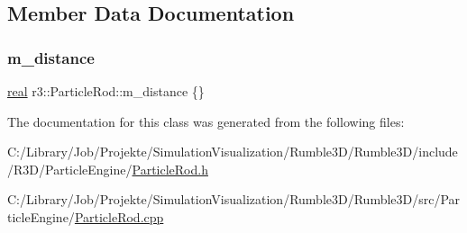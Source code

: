 \subsection{Member Data Documentation}
\mbox{\label{classr3_1_1_particle_rod_af5a502fa94afea7144eadd509a951f70}} 
\subsubsection{\texorpdfstring{m\+\_\+distance}{m\_distance}}
{\footnotesize\ttfamily \mbox{\hyperlink{namespacer3_ab2016b3e3f743fb735afce242f0dc1eb}{real}} r3\+::\+Particle\+Rod\+::m\+\_\+distance \{\}\hspace{0.3cm}{\ttfamily [protected]}}



The documentation for this class was generated from the following files\+:\begin{DoxyCompactItemize}
\item 
C\+:/\+Library/\+Job/\+Projekte/\+Simulation\+Visualization/\+Rumble3\+D/\+Rumble3\+D/include/\+R3\+D/\+Particle\+Engine/\mbox{\hyperlink{_particle_rod_8h}{Particle\+Rod.\+h}}\item 
C\+:/\+Library/\+Job/\+Projekte/\+Simulation\+Visualization/\+Rumble3\+D/\+Rumble3\+D/src/\+Particle\+Engine/\mbox{\hyperlink{_particle_rod_8cpp}{Particle\+Rod.\+cpp}}\end{DoxyCompactItemize}
